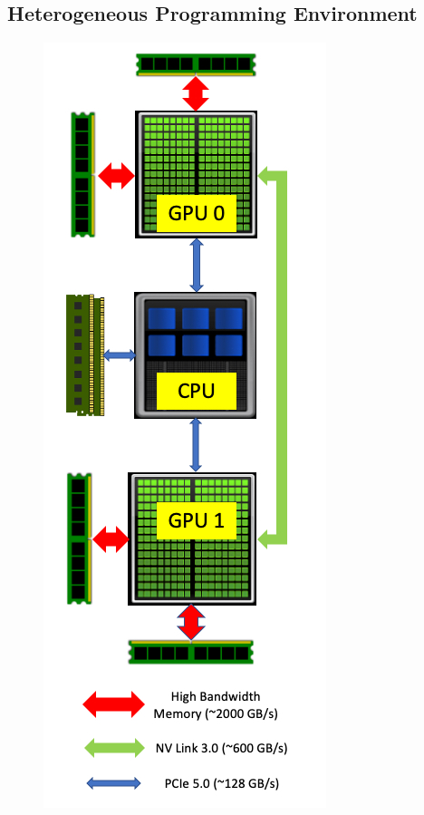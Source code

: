 \subsection{Heterogeneous Programming Environment}
\begin{figure}[ht]
    \begin{minipage}{0.35\textwidth}
        \includegraphics[width=\textwidth]{fig/cpu-gpu-arch.jpg}

\end{minipage}
\end{figure}
